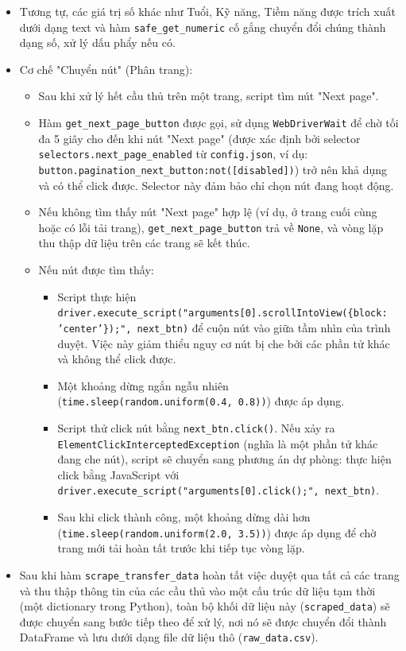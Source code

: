 \documentclass[12pt, a4paper]{report}
\begin{document}
\begin{enumerate}[label=\textbf{Bước \arabic*:}, leftmargin=* , itemsep=1ex]
\begin{itemize}[leftmargin=0em]
\begin{itemize}
        \end{itemize}
        \item Tương tự, các giá trị số khác như Tuổi, Kỹ năng, Tiềm năng được trích xuất dưới dạng text và hàm \texttt{safe\_get\_numeric} cố gắng chuyển đổi chúng thành dạng số, xử lý dấu phẩy nếu có.
        \item Cơ chế "Chuyển nút" (Phân trang):
        \begin{itemize}
            \item Sau khi xử lý hết cầu thủ trên một trang, script tìm nút "Next page".
            \item Hàm \texttt{get\_next\_page\_button} được gọi, sử dụng \texttt{WebDriverWait} để chờ tối đa 5 giây cho đến khi nút "Next page" (được xác định bởi selector \texttt{selectors.next\_page\_enabled} từ \texttt{config.json}, ví dụ: \texttt{button.pagination\_next\_button:not([disabled])}) trở nên khả dụng và có thể click được. Selector này đảm bảo chỉ chọn nút đang hoạt động.
            \item Nếu không tìm thấy nút "Next page" hợp lệ (ví dụ, ở trang cuối cùng hoặc có lỗi tải trang), \texttt{get\_next\_page\_button} trả về \texttt{None}, và vòng lặp thu thập dữ liệu trên các trang sẽ kết thúc.
            \item Nếu nút được tìm thấy:
            \begin{itemize}
                \item Script thực hiện \sloppypar
                \texttt{driver.execute\_script("arguments[0].scrollIntoView(\{block: 'center'\});", next\_btn)} để cuộn nút vào giữa tầm nhìn của trình duyệt. Việc này giảm thiểu nguy cơ nút bị che bởi các phần tử khác và không thể click được.
                \item Một khoảng dừng ngắn ngẫu nhiên \sloppypar
                (\texttt{time.sleep(random.uniform(0.4, 0.8))}) được áp dụng.
                \item Script thử click nút bằng \texttt{next\_btn.click()}. Nếu xảy ra \sloppypar
                \texttt{ElementClickInterceptedException} \sloppypar (nghĩa là một phần tử khác đang che nút), script sẽ chuyển sang phương án dự phòng: thực hiện click bằng JavaScript với \texttt{driver.execute\_script("arguments[0].click();", next\_btn)}.
                \item Sau khi click thành công, một khoảng dừng dài hơn (\texttt{time.sleep(random.uniform(2.0, 3.5))}) được áp dụng để chờ trang mới tải hoàn tất trước khi tiếp tục vòng lặp.
            \end{itemize}
        \end{itemize}
        \item Sau khi hàm \texttt{scrape\_transfer\_data} hoàn tất việc duyệt qua tất cả các trang và thu thập thông tin của các cầu thủ vào một cấu trúc dữ liệu tạm thời (một dictionary trong Python), toàn bộ khối dữ liệu này (\texttt{scraped\_data}) sẽ được chuyển sang bước tiếp theo để xử lý, nơi nó sẽ được chuyển đổi thành DataFrame và lưu dưới dạng file dữ liệu thô (\texttt{raw\_data.csv}).
    \end{itemize}


\end{enumerate}
\end{document}
